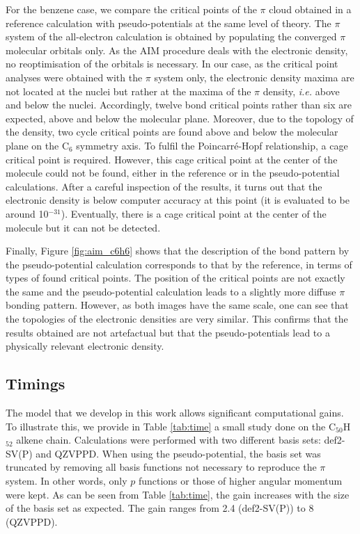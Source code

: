\documentclass[12pt]{article}
\begin{document}
For the benzene case, we compare the critical points of the $\pi$ cloud obtained in a reference calculation
with pseudo-potentials at the same level of theory.
The $\pi$ system of the all-electron calculation is obtained by populating the converged $\pi$ molecular orbitals only.
As the AIM procedure deals with the electronic density, no reoptimisation of the orbitals is necessary.
In our case, as the critical point analyses were obtained
with the $\pi$ system only, the electronic density maxima are not
located at the nuclei but rather at the maxima of the $\pi$ density, 
\emph{i.e.} above and below the nuclei. %
Accordingly, twelve bond critical points rather than six are expected,
above and below the molecular plane.
Moreover, due to the topology of the density, two cycle critical points are found above and below the molecular
plane on the C$_6$ symmetry axis.
To fulfil the Poincarré-Hopf relationship, a cage critical point is required. However, this cage critical point 
at the center of the molecule could not be found, either in the reference or in the pseudo-potential 
calculations.
After a careful inspection of the results, it turns out that the electronic density
is below computer accuracy at this point (it is evaluated to be around 10$^{-31}$).
Eventually, there is a cage critical point at the center of
the molecule but it can not be detected.

Finally, Figure \ref{fig:aim_c6h6} shows that the description of the bond pattern by the pseudo-potential
calculation corresponds to that by the reference, in terms of types of found critical points.
The position of the critical points are not exactly the same and the pseudo-potential calculation
leads to a slightly more diffuse $\pi$ bonding pattern.
However, as both images have the same scale, one can see that the topologies
of the electronic densities are very similar.
This confirms that the results obtained are not artefactual but that the pseudo-potentials
lead to a physically relevant electronic density.

\subsection*{\sffamily \large Timings}
The model that we develop in this work allows significant computational gains.
To illustrate this, we provide in Table \ref{tab:time} a small study done on the C$_{50}$H$_{52}$
alkene chain.
Calculations were performed with two different basis sets: def2-SV(P) and QZVPPD.
When using the pseudo-potential, the basis set was truncated by removing all
basis functions not necessary to reproduce the
$\pi$ system.
In other words, only $p$ functions or those of higher angular momentum were kept.
As can be seen from Table \ref{tab:time}, the gain increases
with the size of the basis set as expected.
The gain ranges from 2.4 (def2-SV(P)) to 8 (QZVPPD).
\end{document}
